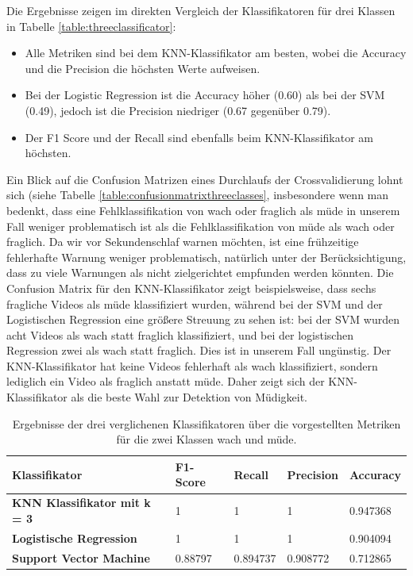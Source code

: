 Die Ergebnisse zeigen im direkten Vergleich der Klassifikatoren für drei Klassen in Tabelle \ref{table:threeclassificator}:

\begin{itemize}
\item Alle Metriken sind bei dem KNN-Klassifikator am besten, wobei die Accuracy und die Precision die höchsten Werte aufweisen.
\item Bei der Logistic Regression ist die Accuracy höher (0.60) als bei der SVM (0.49), jedoch ist die Precision niedriger (0.67 gegenüber 0.79).
\item Der F1 Score und der Recall sind ebenfalls beim KNN-Klassifikator am höchsten.
\end{itemize}

Ein Blick auf die Confusion Matrizen eines Durchlaufs der Crossvalidierung lohnt sich (siehe Tabelle \ref{table:confusionmatrixthreeclasses}, insbesondere wenn man bedenkt, dass eine Fehlklassifikation von \glqq wach\grqq{} oder \glqq fraglich\grqq{} als \glqq müde\grqq{} in unserem Fall weniger problematisch ist als die Fehlklassifikation von \glqq müde\grqq{} als \glqq wach\grqq{} oder \glqq fraglich\grqq{}. Da wir vor Sekundenschlaf warnen möchten, ist eine frühzeitige fehlerhafte Warnung weniger problematisch, natürlich unter der Berücksichtigung, dass zu viele Warnungen als nicht zielgerichtet empfunden werden könnten. Die Confusion Matrix für den KNN-Klassifikator zeigt beispielsweise, dass sechs \glqq fragliche\grqq{} Videos als \glqq müde\grqq{} klassifiziert wurden, während bei der SVM und der Logistischen Regression eine größere Streuung zu sehen ist: bei der SVM wurden acht Videos als \glqq wach\grqq{} statt \glqq fraglich\grqq{} klassifiziert, und bei der logistischen Regression zwei als \glqq wach\grqq{} statt \glqq fraglich\grqq{}. Dies ist in unserem Fall ungünstig. Der KNN-Klassifikator hat keine Videos fehlerhaft als \glqq wach\grqq{} klassifiziert, sondern lediglich ein Video als \glqq fraglich\grqq{} anstatt \glqq müde\grqq{}. Daher zeigt sich der KNN-Klassifikator als die beste Wahl zur Detektion von Müdigkeit.

\begin{table}
    \centering
    \begin{tabular}{lllll}

        \textbf{Klassifikator} & \textbf{F1-Score} & \textbf{Recall} & \textbf{Precision} & \textbf{Accuracy} \\ \hline
        \textbf{KNN Klassifikator mit k = 3} & 1 & 1 & 1 & 0.947368 \\ 
        \textbf{Logistische Regression} & 1 & 1 & 1 & 0.904094 \\ 
        \textbf{Support Vector Machine} & 0.88797 & 0.894737 & 0.908772 & 0.712865 \\ 
    \end{tabular}
\caption{Ergebnisse der drei verglichenen Klassifikatoren über die vorgestellten Metriken für die zwei Klassen wach und müde.}
\label{table:twoclassificator}
\end{table}

